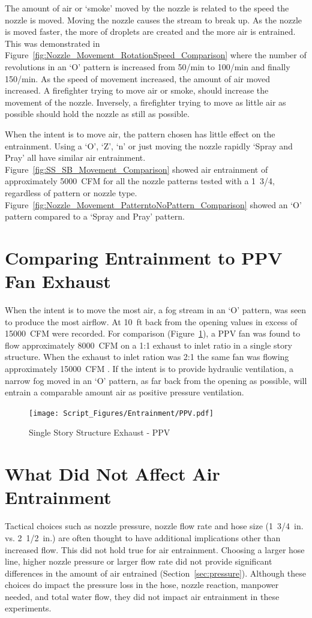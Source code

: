 \documentclass[12pt,oneside]{book}
\begin{document}
The amount of air or `smoke' moved by the nozzle is related to the speed the nozzle is moved. Moving the nozzle causes the stream to break up. As the nozzle is moved faster, the more of droplets are created and the more air is entrained. This was demonstrated in Figure~\ref{fig:Nozzle_Movement_RotationSpeed_Comparison} where the number of revolutions in an `O' pattern is increased from 50/min to 100/min and finally 150/min. As the speed of movement increased, the amount of air moved increased. A firefighter trying to move air or smoke, should increase the movement of the nozzle. Inversely, a firefighter trying to move as little air as possible should hold the nozzle as still as possible.  

When the intent is to move air, the pattern chosen has little effect on the entrainment. Using a `O', `Z', `n' or just moving the nozzle rapidly `Spray and Pray' all have similar air entrainment. Figure~\ref{fig:SS_SB_Movement_Comparison} showed air entrainment of approximately 5000~CFM for all the nozzle patterns tested with a 1~3/4, regardless of pattern or nozzle type. Figure~\ref{fig:Nozzle_Movement_PatterntoNoPattern_Comparison} showed an `O' pattern compared to a `Spray and Pray' pattern.

\section{Comparing Entrainment to PPV Fan Exhaust}
When the intent is to move the most air, a fog stream in an `O' pattern, was seen to produce the most airflow. At 10~ft back from the opening values in excess of 15000~CFM were recorded. For comparison (Figure~\ref{fig:PPV}), a PPV fan was found to flow approximately 8000~CFM on a 1:1 exhaust to inlet ratio in a single story structure. When the exhaust to inlet ration was 2:1 the same fan was flowing approximately 15000~CFM \cite{Zevotek_Kerber:2016}. If the intent is to provide hydraulic ventilation, a narrow fog moved in an `O' pattern, as far back from the opening as possible, will entrain a comparable amount air as positive pressure ventilation. 

\begin{figure}[!ht]
\centering
\texttt{[image: Script\_Figures/Entrainment/PPV.pdf]}
\caption[Single Story Structure Exhaust - PPV]{Single Story Structure Exhaust - PPV \cite{Zevotek_Kerber:2016}}
\label{fig:PPV}
\end{figure}

\section{What Did Not Affect Air Entrainment}
Tactical choices such as nozzle pressure, nozzle flow rate and hose size (1~3/4~in. vs. 2~1/2~in.) are often thought to have additional implications other than increased flow. This did not hold true for air entrainment. Choosing a larger hose line, higher nozzle pressure or larger flow rate did not provide significant differences in the amount of air entrained (Section~\ref{sec:pressure}). Although these choices do impact the pressure loss in the hose, nozzle reaction, manpower needed, and total water flow, they did not impact air entrainment in these experiments.
\end{document}
